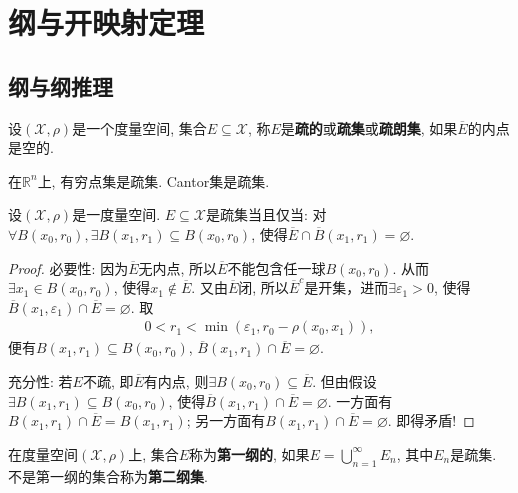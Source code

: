 \documentclass[../../main.tex]{subfiles}%
\begin{document}
\section{纲与开映射定理}

\subsection{纲与纲推理}

\begin{definition}
设$(\mathscr{X},\rho)$是一个度量空间, 集合$E\subseteq\mathscr{X}$, 称$E$是\textbf{疏的}或\textbf{疏集}或\textbf{疏朗集}, 如果$\overline{E}$的内点是空的.
\end{definition}

\begin{examples}
在$\mathbb{R}^n$上, 有穷点集是疏集. Cantor集是疏集.
\end{examples}

\begin{proposition}
设$(\mathscr{X},\rho)$是一度量空间. $E\subseteq\mathscr{X}$是疏集当且仅当: 对$\forall B(x_0,r_0),\exists B(x_1,r_1)\subseteq B(x_0,r_0)$, 使得$\overline{E}\cap\overline{B}(x_1,r_1)=\varnothing$.
\end{proposition}
\begin{proof}

{\heiti 必要性:} 因为$\overline{E}$无内点, 所以$\overline{E}$不能包含任一球$B(x_0,r_0)$. 从而$\exists x_1\in B(x_0,r_0)$, 使得$x_1\notin\overline{E}$. 又由$\overline{E}$闭, 所以$\overline{E}^c$是开集，进而$\exists\varepsilon_1>0$, 使得$\overline{B}(x_1,\varepsilon_1)\cap\overline{E}=\varnothing$. 取
\begin{align*}
0<r_1<\min(\varepsilon_1,r_0-\rho(x_0,x_1)),
\end{align*}
便有$B(x_1,r_1)\subseteq B(x_0,r_0)$, $\overline{B}(x_1,r_1)\cap\overline{E}=\varnothing$.

{\heiti 充分性:} 若$E$不疏, 即$\overline{E}$有内点, 则$\exists B(x_0,r_0)\subseteq\overline{E}$. 但由假设$\exists B(x_1,r_1)\subseteq B(x_0,r_0)$, 使得$\overline{B}(x_1,r_1)\cap\overline{E}=\varnothing$. 一方面有$B(x_1,r_1)\cap\overline{E}=B(x_1,r_1)$; 另一方面有$B(x_1,r_1)\cap\overline{E}=\varnothing$. 即得矛盾!
\end{proof}

\begin{definition}
在度量空间$(\mathscr{X},\rho)$上, 集合$E$称为\textbf{第一纲的}, 如果$E=\bigcup\limits_{n=1}^{\infty}E_n$, 其中$E_n$是疏集. 不是第一纲的集合称为\textbf{第二纲集}.
\end{definition}
\end{document}
